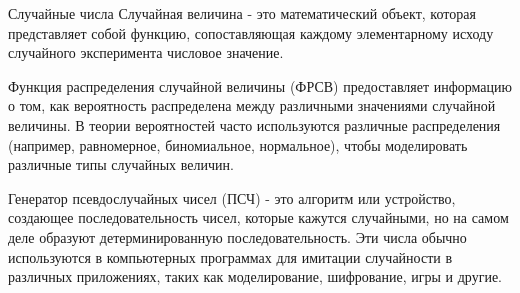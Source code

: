\documentclass{beamer}
\begin{document}
	\begin{frame}{Случайные числа}
		Случайная величина - это математический объект, которая представляет собой функцию, сопоставляющая каждому элементарному исходу случайного эксперимента числовое значение.

		Функция распределения случайной величины (ФРСВ) предоставляет информацию о том, как вероятность распределена между различными значениями случайной величины. В теории вероятностей часто используются различные распределения (например, равномерное, биномиальное, нормальное), чтобы моделировать различные типы случайных величин.
		
		Генератор псевдослучайных чисел (ПСЧ) - это алгоритм или устройство, создающее последовательность чисел, которые кажутся случайными, но на самом деле образуют детерминированную последовательность. Эти числа обычно используются в компьютерных программах для имитации случайности в различных приложениях, таких как моделирование, шифрование, игры и другие.


	\end{frame}

	
\end{document}
